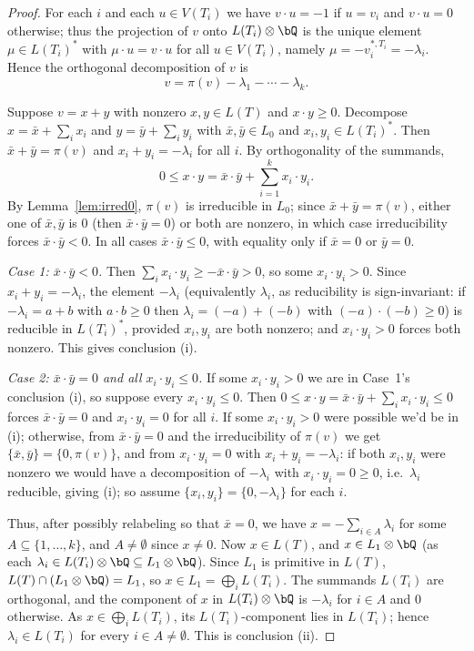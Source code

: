 \begin{proof}
For each $i$ and each $u\in V(T_i)$ we have $v\cdot u=-1$ if $u=v_i$ and
$v\cdot u=0$ otherwise; thus the projection of $v$ onto $L(T_i)\otimes\bQ$ is the
unique element $\mu\in L(T_i)^{*}$ with $\mu\cdot u=v\cdot u$ for all $u\in
V(T_i)$, namely $\mu=-v_i^{*,T_i}=-\lambda_i$. Hence the orthogonal
decomposition of $v$ is
\begin{equation}\label{eq:vdecomp}
v=\pi(v)-\lambda_1-\cdots-\lambda_k.
\end{equation}

Suppose $v=x+y$ with nonzero $x,y\in L(T)$ and $x\cdot y\geq0$. Decompose
$x=\bar x+\sum_i x_i$ and $y=\bar y+\sum_i y_i$ with $\bar x,\bar y\in L_0$ and
$x_i,y_i\in L(T_i)^{*}$. Then $\bar x+\bar y=\pi(v)$ and $x_i+y_i=-\lambda_i$ for
all $i$. By orthogonality of the summands,
\[
0\leq x\cdot y=\bar x\cdot\bar y+\sum_{i=1}^{k}x_i\cdot y_i.
\]
By Lemma~\ref{lem:irred0}, $\pi(v)$ is irreducible in $L_0$; since
$\bar x+\bar y=\pi(v)$, either one of $\bar x,\bar y$ is $0$ (then $\bar x\cdot
\bar y=0$) or both are nonzero, in which case irreducibility forces $\bar x\cdot
\bar y<0$. In all cases $\bar x\cdot\bar y\le0$, with equality only if
$\bar x=0$ or $\bar y=0$.

\emph{Case 1: $\bar x\cdot\bar y<0$.} Then $\sum_i x_i\cdot y_i\geq-\bar x\cdot
\bar y>0$, so some $x_i\cdot y_i>0$. Since $x_i+y_i=-\lambda_i$, the element
$-\lambda_i$ (equivalently $\lambda_i$, as reducibility is sign-invariant: if
$-\lambda_i=a+b$ with $a\cdot b\ge0$ then $\lambda_i=(-a)+(-b)$ with
$(-a)\cdot(-b)\ge0$) is reducible in $L(T_i)^{*}$, provided $x_i,y_i$ are both
nonzero; and $x_i\cdot y_i>0$ forces both nonzero. This gives conclusion (i).

\emph{Case 2: $\bar x\cdot\bar y=0$ and all $x_i\cdot y_i\le0$.} If some
$x_i\cdot y_i>0$ we are in Case~1's conclusion (i), so suppose every $x_i\cdot
y_i\le0$. Then $0\le x\cdot y=\bar x\cdot\bar y+\sum_i x_i\cdot y_i\le0$ forces
$\bar x\cdot\bar y=0$ and $x_i\cdot y_i=0$ for all $i$. If some $x_i\cdot y_i>0$
were possible we'd be in (i); otherwise, from $\bar x\cdot\bar y=0$ and the
irreducibility of $\pi(v)$ we get $\{\bar x,\bar y\}=\{0,\pi(v)\}$, and from
$x_i\cdot y_i=0$ with $x_i+y_i=-\lambda_i$: if both $x_i,y_i$ were nonzero we
would have a decomposition of $-\lambda_i$ with $x_i\cdot y_i=0\geq0$, i.e.\
$\lambda_i$ reducible, giving (i); so assume $\{x_i,y_i\}=\{0,-\lambda_i\}$ for
each $i$.

Thus, after possibly relabeling so that $\bar x=0$, we have
$x=-\sum_{i\in A}\lambda_i$ for some $A\subseteq\{1,\dots,k\}$, and $A\neq
\emptyset$ since $x\neq0$. Now $x\in L(T)$, and $x\in L_1\otimes\bQ$ (as each
$\lambda_i\in L(T_i)\otimes\bQ\subseteq L_1\otimes\bQ$). Since $L_1$ is primitive
in $L(T)$, $L(T)\cap(L_1\otimes\bQ)=L_1$, so $x\in L_1=\bigoplus_i L(T_i)$. The
summands $L(T_i)$ are orthogonal, and the component of $x$ in $L(T_i)\otimes\bQ$
is $-\lambda_i$ for $i\in A$ and $0$ otherwise. As $x\in\bigoplus_i L(T_i)$, its
$L(T_i)$-component lies in $L(T_i)$; hence $\lambda_i\in L(T_i)$ for every $i\in
A\neq\emptyset$. This is conclusion (ii).
\end{proof}

